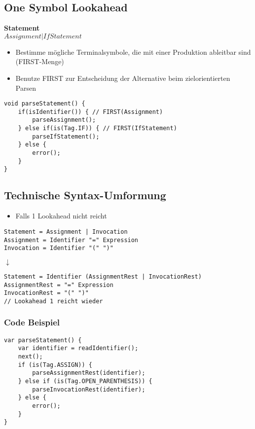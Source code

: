 \subsection{One Symbol Lookahead}
\textbf{Statement}\\
$Assignment | IfStatement$
\begin{itemize}
    \item Bestimme mögliche Terminalsymbole, die mit einer Produktion ableitbar sind (FIRST-Menge)
    \item Benutze FIRST zur Entscheidung der Alternative beim zielorientierten Parsen
\end{itemize}
\begin{lstlisting}
void parseStatement() {
    if(isIdentifier()) { // FIRST(Assignment)
        parseAssignment();
    } else if(is(Tag.IF)) { // FIRST(IfStatement)
        parseIfStatement();
    } else {
        error();
    }
}
\end{lstlisting}

\subsection{Technische Syntax-Umformung}
\begin{itemize}
    \item Falls 1 Lookahead nicht reicht
\end{itemize}
\begin{lstlisting}
Statement = Assignment | Invocation
Assignment = Identifier "=" Expression
Invocation = Identifier "(" ")"
\end{lstlisting}

\begin{center}
    $\downarrow$
\end{center}

\begin{lstlisting}
Statement = Identifier (AssignmentRest | InvocationRest)
AssignmentRest = "=" Expression 
InvocationRest = "(" ")"
// Lookahead 1 reicht wieder
\end{lstlisting}

\subsubsection{Code Beispiel}
\begin{lstlisting}
var parseStatement() {
    var identifier = readIdentifier();
    next();
    if (is(Tag.ASSIGN)) {
        parseAssignmentRest(identifier);
    } else if (is(Tag.OPEN_PARENTHESIS)) {
        parseInvocationRest(identifier);
    } else {
        error();
    }
}
\end{lstlisting}